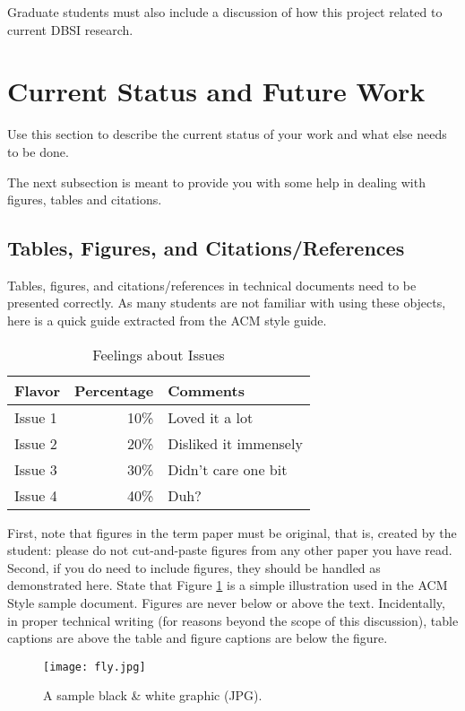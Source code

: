 \documentclass{sig-alternate}
\begin{document}
Graduate students must also include a discussion of how this project
related to current DBSI research.

\section{Current Status and Future Work}
\label{current status}

Use this section to describe the current status of your work
and what else needs to be done.

The next subsection is meant to provide you with some help
in dealing with figures, tables and citations.

\subsection{Tables, Figures, and Citations/References}

Tables, figures, and citations/references in technical
documents need to be presented correctly. As many students
are not familiar with using these objects, here is a quick
guide extracted from the ACM style guide.

\begin{table}
\centering
\caption{Feelings about Issues}
\begin{tabular}{|l|r|l|} \hline
Flavor&Percentage&Comments\\ \hline
Issue 1 &  10\% & Loved it a lot\\ \hline
Issue 2 &  20\% & Disliked it immensely\\ \hline
Issue 3 &  30\% & Didn't care one bit\\ \hline
Issue 4 &  40\% & Duh?\\ \hline
\end{tabular}
\end{table}


First, note that figures in the term paper must be original,
that is, created by the student: please do not cut-and-paste
figures from any other paper you have read. Second, if you
do need to include figures, they should be handled as
demonstrated here. State that Figure \ref{sample graphic} is
a simple illustration used in the ACM Style sample
document. Figures are never below or above the
text. Incidentally, in proper technical writing (for reasons
beyond the scope of this discussion), table captions are
above the table and figure captions are below the figure.

\begin{figure}[htb]
\label{sample graphic}
\begin{center}
\texttt{[image: fly.jpg]}
\caption{A sample black \& white graphic (JPG).}
\end{center}
\end{figure}
\end{document}
